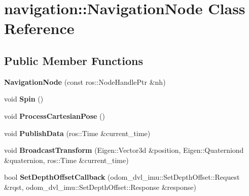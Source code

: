 \hypertarget{classnavigation_1_1NavigationNode}{}\section{navigation\+:\+:Navigation\+Node Class Reference}
\label{classnavigation_1_1NavigationNode}
\subsection*{Public Member Functions}
\begin{DoxyCompactItemize}
\item 
\mbox{\label{classnavigation_1_1NavigationNode_abccc1132cbda197d50c3e77318b54ef5}} 
{\bfseries Navigation\+Node} (const ros\+::\+Node\+Handle\+Ptr \&nh)
\item 
\mbox{\label{classnavigation_1_1NavigationNode_acfb226912b0b116ef2754286901f303e}} 
void {\bfseries Spin} ()
\item 
\mbox{\label{classnavigation_1_1NavigationNode_af56f532c42808bca67db4fe71c7c7d2c}} 
void {\bfseries Process\+Cartesian\+Pose} ()
\item 
\mbox{\label{classnavigation_1_1NavigationNode_a005d7dbd2eb1895f38992971a863edff}} 
void {\bfseries Publish\+Data} (ros\+::\+Time \&current\+\_\+time)
\item 
\mbox{\label{classnavigation_1_1NavigationNode_ac52546f98124cdc13de5ab8930572e61}} 
void {\bfseries Broadcast\+Transform} (Eigen\+::\+Vector3d \&position, Eigen\+::\+Quaterniond \&quaternion, ros\+::\+Time \&current\+\_\+time)
\item 
\mbox{\label{classnavigation_1_1NavigationNode_a1f8a76dd3fbda6df554b144515dd08cd}} 
bool {\bfseries Set\+Depth\+Offset\+Callback} (odom\+\_\+dvl\+\_\+imu\+::\+Set\+Depth\+Offset\+::\+Request \&rqst, odom\+\_\+dvl\+\_\+imu\+::\+Set\+Depth\+Offset\+::\+Response \&response)
\item 
\mbox{\label{classnavigation_1_1NavigationNode_aaefa2ce87f44e8b06462a8ebaae2bb25}} 

\end{DoxyCompactItemize}
